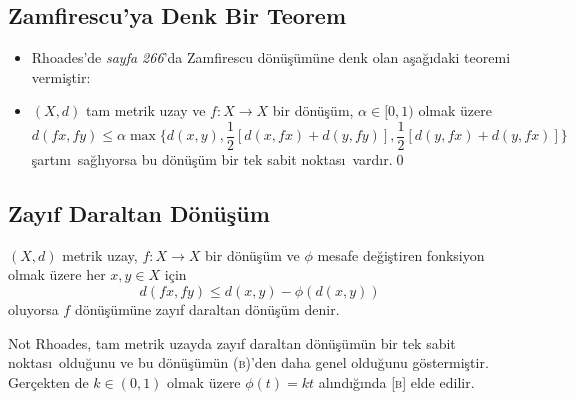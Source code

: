 \documentclass[8pt]{beamer}
\begin{document}
\subsection{Zamfirescu'ya Denk Bir Teorem}
\begin{frame}
\begin{itemize}[<+-| alert@+>]  

 \item[] Rhoades\cite{Rhoades1977}'de \textit{sayfa 266}'da Zamfirescu d\"{o}n\"{u}\c{s}\"{u}m\"{u}ne denk olan a\c{s}a\u{g}\i daki teoremi vermi\c{s}tir:

 \item[] \begin{lemma}
  $(X,d)$ tam metrik uzay ve $f: X \rightarrow X$ bir d\"{o}n\"{u}\c{s}\"{u}m,
  $\alpha \in [0,1)$ olmak \"uzere
  \begin{equation*}
    d(fx, fy)\leq \alpha\max\bigg\{ d(x,y), \frac{1}{2}[d(x,fx)+d(y,fy)], \frac{1}{2}[d(y,fx)+d(y,fx)] \bigg\} 
  \end{equation*}
  \c{s}art\i n\i\ sa\u{g}l\i yorsa bu d\"{o}n\"{u}\c{s}\"{u}m bir tek sabit noktas\i\ vard\i r.\qed
\end{lemma}

\end{itemize}

\end{frame}%


\subsection{Zay\i f Daraltan D\"{o}n\"{u}\c{s}\"{u}m}
\begin{frame}
  \begin{definition}
     $(X,d)$ metrik uzay, $f: X \rightarrow X$ bir d\"{o}n\"{u}\c{s}\"{u}m ve $\phi$ mesafe de\u{g}i\c{s}tiren fonksiyon olmak \"uzere her $x, y\in X$ i\c{c}in
     \begin{equation*}
       d(fx,fy)\leq d(x,y)-\phi(d(x,y))
     \end{equation*}
oluyorsa $f$ d\"{o}n\"{u}\c{s}\"{u}m\"{u}ne zay\i f daraltan d\"{o}n\"{u}\c{s}\"{u}m denir.
  \end{definition}
  \begin{block}{Not}
    Rhoades\cite{Rhoades2001}, tam metrik uzayda zay\i f daraltan
    d\"{o}n\"{u}\c{s}\"{u}m\"un bir tek sabit noktas\i \ oldu\u{g}unu
    ve bu d\"{o}n\"{u}\c{s}\"{u}m\"un \textsc{(b)}'den daha genel
    oldu\u{g}unu g\"ostermi\c{s}tir. Ger\c{c}ekten de $k\in(0,1)$
    olmak \"uzere $\phi(t)=kt$ al\i nd\i \u{g}\i nda \textsc{[b]} elde
    edilir.
  \end{block}

\end{frame}
\end{document}
